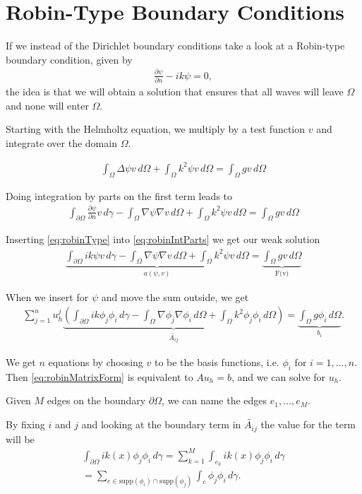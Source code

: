 \documentclass[10pt,a4paper]{article}
\begin{document}
\section*{Robin-Type Boundary Conditions}
If we instead of the Dirichlet boundary conditions take a look at a Robin-type boundary condition, given by
\begin{align}\label{eq:robinType}
\frac{\partial \psi}{\partial n} - ik\psi = 0,
\end{align}
the idea is that we will obtain a solution that ensures that all waves will leave $\Omega$ and none will enter $\Omega$. \cite{Project}

Starting with the Helmholtz equation, we multiply by a test function $v$ and integrate over the domain $\Omega$. 

\begin{align}
\int_\Omega \Delta \psi v \, d\Omega + \int_\Omega k^2 \psi v \, d\Omega = \int_\Omega gv \, d\Omega
\end{align}

Doing integration by parts on the first term leads to
\begin{align}\label{eq:robinIntParts}
\int_{\partial \Omega} \frac{\partial \psi}{\partial n} v \, d\gamma - \int_\Omega \nabla \psi \nabla v \, d\Omega + \int_\Omega k^2 \psi v \, d\Omega = \int_\Omega gv \, d\Omega
\end{align}

Inserting \eqref{eq:robinType} into \eqref{eq:robinIntParts} we get our weak solution
\begin{align}\label{eq:robinWeakSol}
\underbrace{\int_{\partial \Omega} ik\psi v \, d\gamma - \int_\Omega \nabla \psi \nabla v \, d\Omega + \int_\Omega k^2 \psi v \, d\Omega} _\text{$a(\psi, v)$} = \underbrace{\int_\Omega gv \, d\Omega} _\text{F(v)}
\end{align}

When we insert for $\psi$ and move the sum outside, we get
\begin{align}\label{eq:robinMatrixForm}
\sum_{j=1}^n u_h^j \underbrace{\left( \int_{\partial \Omega} ik\phi_j \phi_i \, d\gamma - \int_\Omega \nabla \phi_j \nabla \phi_i \, d\Omega + \int_\Omega k^2 \phi_j \phi_i \, d\Omega \right)} _\text{$\tilde{{A_{ij}}}$} = \underbrace{\int_{\Omega} g\phi_i \, d\Omega} _\text{$b_i$}.
\end{align}

We get $n$ equations by choosing $v$ to be the basis functions, i.e. $\phi_i$ for $i = 1, \dots, n$. Then \eqref{eq:robinMatrixForm} is equivalent to $A u_h = b$, and we can solve for $u_h$.

Given $M$ edges on the boundary $\partial \Omega$, we can name the edges $e_1, \dots, e_M$. 

By fixing $i$ and $j$ and looking at the boundary term in $\tilde{A_{ij}}$ the value for the term will be
\begin{align}
\int_{\partial \Omega} ik(x)\phi_j \phi_i \, d\gamma = \sum_{k=1}^M \int_{e_k} ik(x)\phi_j \phi_i \, d\gamma\\
= \sum_{e \in \textrm{supp}(\phi_i) \cap \textrm{supp}(\phi_j)} \int_e \phi_j \phi_i \, d\gamma.
\end{align}
\end{document}
